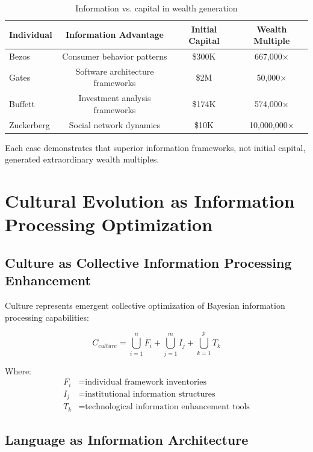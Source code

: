 \documentclass[12pt,a4paper]{article}
\begin{document}
\begin{table}[H]
\centering
\begin{tabular}{lccc}
\toprule
\textbf{Individual} & \textbf{Information Advantage} & \textbf{Initial Capital} & \textbf{Wealth Multiple} \\
\midrule
Bezos & Consumer behavior patterns & \$300K & 667,000× \\
Gates & Software architecture frameworks & \$2M & 50,000× \\
Buffett & Investment analysis frameworks & \$174K & 574,000× \\
Zuckerberg & Social network dynamics & \$10K & 10,000,000× \\
\bottomrule
\end{tabular}
\caption{Information vs. capital in wealth generation}
\end{table}

Each case demonstrates that superior information frameworks, not initial capital, generated extraordinary wealth multiples.

\section{Cultural Evolution as Information Processing Optimization}

\subsection{Culture as Collective Information Processing Enhancement}

Culture represents emergent collective optimization of Bayesian information processing capabilities:

\begin{equation}
C_{culture} = \bigcup_{i=1}^{n} F_i + \bigcup_{j=1}^{m} I_j + \bigcup_{k=1}^{p} T_k
\end{equation}

Where:
\begin{align}
F_i &= \text{individual framework inventories} \\
I_j &= \text{institutional information structures} \\  
T_k &= \text{technological information enhancement tools}
\end{align}

\subsection{Language as Information Architecture}
\end{document}
